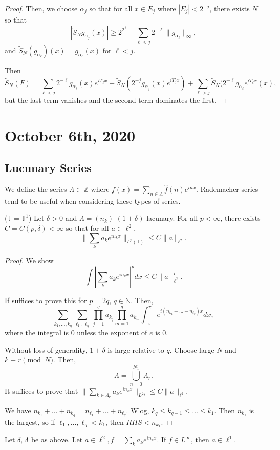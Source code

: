 \documentclass[11pt]{scrartcl}
\newcommand{\N}{\mathbb{N}}
\newcommand{\Z}{\mathbb{Z}}
\newcommand{\T}{\mathbb T}
\let \hat \widehat
\newcommand{\<}{\langle}
\renewcommand{\>}{\rangle}
\begin{document}
\begin{proof}
 Then, we choose $\alpha_j$ so that for all $x \in E_j$ where $|E_j| < 2^{-j}$, there exists $N$ so that $$|\tilde{S}_N g_{\alpha_j}(x)| \ge 2^{2^j} + \sum_{\ell < j} 2^{-\ell} \|g_{\alpha_\ell}\|_\infty,$$
 and $\tilde{S}_N(g_{\alpha_\ell})(x) = g_{\alpha_\ell}(x)$ for $\ell < j$.
 
 Then $$\tilde{S}_N(F) = \sum_{\ell < j} 2^{-\ell}g_{\alpha_\ell}(x)e^{iT_\ell x} + \tilde{S}_N(2^{-j}g_{\alpha_j}(x)e^{iT_j x}) + \sum_{\ell > j} \tilde{S}_N(2^{-\ell}g_{\alpha_\ell} e^{iT_\ell x}(x),$$
 but the last term vanishes and the second term dominates the first.
\end{proof}
\pagebreak
\section{October 6th, 2020}
\subsection{Lucunary Series}
We define the series $\Lambda \subset \Z$ where $f(x) = \sum_{n \in \Lambda} \hat{f}(n) e^{inx}.$
Rademacher series tend to be useful when considering these types of series.

\begin{thm} ($\T = \T^1$) Let $\delta > 0$ and $\Lambda = (n_k)$ $(1+\delta)$-lacunary.  For all $p < \infty$, there exists $C = C(p, \delta) < \infty$ so that for all $a \in \ell^2$,
$$\|\sum_k a_k e^{in_k x}\|_{L^p(\T)} \le C\|a\|_{\ell^2}.$$
\end{thm}
\begin{proof}
We show
$$\int |\sum_k a_k e^{in_k x}|^p dx \le C\|a\|_{\ell^2}^l.$$

If suffices to prove this for $p = 2q$, $q \in \N$.  Then,
$$\sum_{k_1,\dots, k_q} \sum_{\ell_1, \ell_q} \prod_{j=1}^{q} a_{k_j}\prod_{m=1}^q \overline{a_{k_m}}\int_{-\pi} ^\pi e^{i(n_{k_1} + \dots -n_{\ell_q})x}dx,$$
where the integral is $0$ unless the exponent of $e$ is $0$.  

Without loss of generality, $1 + \delta$ is large relative to $q$.  Choose large $N$ and $k \equiv r \pmod N$.  Then,
$$\Lambda = \bigcup_{n=0}^{N_1} \Lambda_r.$$
It suffices to prove that $\|\sum_{k \in \Lambda_r} a_k e^{in_k x}\|_{L^{2q}} \le C\|a\|_{\ell^2}.$

We have $n_{k_1} + \dots + n_{k_q} = n_{\ell_1} + \dots + n_{\ell_q}$.  Wlog, $k_q \le k_{q-1} \le \dots \le k_1$.  Then $n_{k_1}$ is the largest, so if $\ell_1, \dots, \ell_q < k_1$, then $RHS < n_{k_1}$.
\end{proof}
\begin{thm} Let $\delta, \Lambda$ be as above.  Let $a \in \ell^2, f = \sum_k a_ke^{in_k x}.$  If $f \in L^{\infty}$, then $a \in \ell^1$.
\end{thm}
\end{document}
